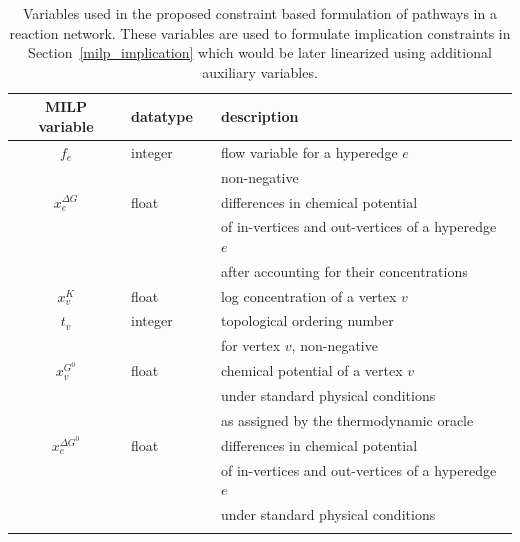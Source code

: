 \begin{table}[!t]
    \centering
    \begin{footnotesize}
    \begin{tabular}{clll}
        \\\toprule
        MILP variable & datatype & & description \\
        \midrule
        $f_e$ & integer & & flow variable for a hyperedge $e$ \\
        &&&  non-negative \\
        $x^{\Delta G}_e$ & float & & differences in chemical potential \\
        & & &  of in-vertices and out-vertices of a hyperedge $e$ \\
        & & & after accounting for their concentrations \\ 
        $x_v^K$ & float & & log concentration of a vertex $v$\\
        $t_v$ & integer & & topological ordering number \\
        &&& for vertex $v$, non-negative\\
        \midrule
        $x^{G^0}_v$ & float & & chemical potential of a vertex $v$ \\
        &&& under standard physical conditions \\
        & & & as assigned by the thermodynamic oracle \\
        $x^{\Delta G^0}_e$ & float & & differences in chemical potential \\
        &&& of in-vertices and out-vertices of a hyperedge $e$ \\
        & & & under standard physical conditions \\
        \bottomrule\\
    \end{tabular}
    \end{footnotesize}
    \caption{Variables used in the proposed constraint based formulation of pathways in a reaction network. These variables are used to formulate implication constraints in Section~\ref{milp_implication} which would be later linearized using additional auxiliary variables.}
    \label{tab: MILPvariables}
\end{table}

